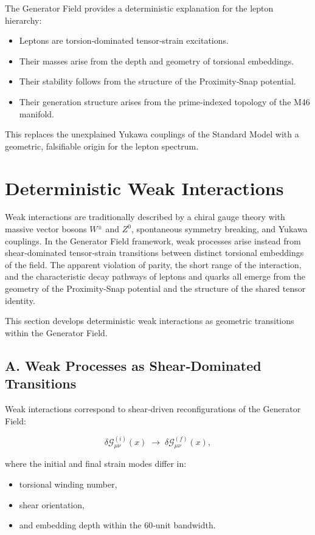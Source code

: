 \documentclass[reprint,amsmath,amssymb,aps,prl,floatfix]{revtex4-2}
\begin{document}
The Generator Field provides a deterministic explanation for the lepton hierarchy:
\begin{itemize}
\item Leptons are torsion‑dominated tensor‑strain excitations.  
\item Their masses arise from the depth and geometry of torsional embeddings.  
\item Their stability follows from the structure of the Proximity‑Snap potential.  
\item Their generation structure arises from the prime‑indexed topology of the M46 manifold.  
\end{itemize}

This replaces the unexplained Yukawa couplings of the Standard Model with a geometric, falsifiable origin for the lepton spectrum.

\section{Deterministic Weak Interactions}

Weak interactions are traditionally described by a chiral gauge theory with massive vector bosons \(W^\pm\) and \(Z^0\), spontaneous symmetry breaking, and Yukawa couplings. In the Generator Field framework, weak processes arise instead from shear‑dominated tensor‑strain transitions between distinct torsional embeddings of the field. The apparent violation of parity, the short range of the interaction, and the characteristic decay pathways of leptons and quarks all emerge from the geometry of the Proximity‑Snap potential and the structure of the shared tensor identity.
\medskip

This section develops deterministic weak interactions as geometric transitions within the Generator Field.

\subsection{A. Weak Processes as Shear‑Dominated Transitions}

Weak interactions correspond to shear‑driven reconfigurations of the Generator Field:
\medskip

\[
\delta\mathcal{G}_{\mu\nu}^{(i)}(x)
\;\longrightarrow\;
\delta\mathcal{G}_{\mu\nu}^{(f)}(x),
\]

where the initial and final strain modes differ in:
\begin{itemize}
\item torsional winding number,  
\item shear orientation,  
\item and embedding depth within the 60‑unit bandwidth.
\end{itemize}
\end{document}
